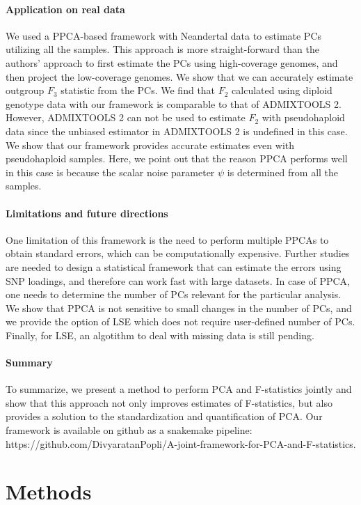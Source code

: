 \documentclass[12pt, letterpaper]{article}
\begin{document}
\paragraph{Application on real data}
We used a PPCA-based framework with Neandertal data to estimate PCs utilizing all the samples. This approach is more straight-forward than the authors' approach to first estimate the PCs using high-coverage genomes, and then project the low-coverage genomes. We show that we can accurately estimate outgroup $F_3$ statistic from the PCs. We find that $F_2$ calculated using diploid genotype data with our framework is comparable to that of ADMIXTOOLS 2. However, ADMIXTOOLS 2 can not be used to estimate $F_2$ with pseudohaploid data since the unbiased estimator in ADMIXTOOLS 2 is undefined in this case. We show that our framework provides accurate estimates even with pseudohaploid samples. Here, we point out that the reason PPCA performs well in this case is because the scalar noise parameter $\psi$ is determined from all the samples.

\paragraph{Limitations and future directions}
One limitation of this framework is the need to perform multiple PPCAs to obtain standard errors, which can be computationally expensive. Further studies are needed to design a statistical framework that can estimate the errors using SNP loadings, and therefore can work fast with large datasets. In case of PPCA, one needs to determine the number of PCs relevant for the particular analysis. We show that PPCA is not sensitive to small changes in the number of PCs, and we provide the option of LSE which does not require user-defined number of PCs. Finally, for LSE, an algotithm to deal with missing data is still pending. 

\paragraph{Summary}
To summarize, we present a method to perform PCA and F-statistics jointly and show that this approach not only improves estimates of F-statistics, but also provides a solution to the standardization and quantification of PCA. Our framework is available on github as a snakemake pipeline: https://github.com/DivyaratanPopli/A-joint-framework-for-PCA-and-F-statistics.

\section{Methods}
\end{document}
